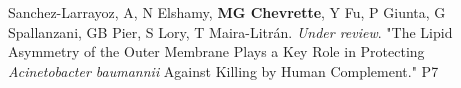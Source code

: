 \begin{cvpubs}


    
    


  \cvpub
    {Sanchez-Larrayoz, A, N Elshamy, \textbf{MG Chevrette}, Y Fu, P Giunta, G Spallanzani, GB Pier, S Lory, T Maira-Litr\'{a}n.  \textit{Under review}. "The Lipid Asymmetry of the Outer Membrane Plays a Key Role in Protecting \textit{Acinetobacter baumannii} Against Killing by Human Complement."} %
    {P7} %
    

\end{cvpubs}
